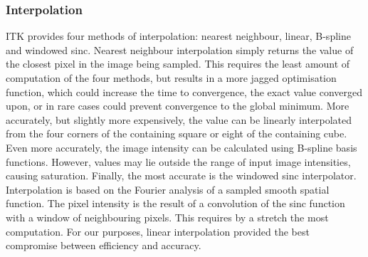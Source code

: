     \subsubsection{Interpolation} %
    \label{ssub:interpolation}
      ITK provides four methods of interpolation: nearest neighbour, linear, B-spline and windowed sinc. Nearest neighbour interpolation simply returns the value of the closest pixel in the image being sampled. This requires the least amount of computation of the four methods, but results in a more jagged optimisation function, which could increase the time to convergence, the exact value converged upon, or in rare cases could prevent convergence to the global minimum. More accurately, but slightly more expensively, the value can be linearly interpolated from the four corners of the containing square or eight of the containing cube. Even more accurately, the image intensity can be calculated using B-spline basis functions. However, values may lie outside the range of input image intensities, causing saturation. Finally, the most accurate is the windowed sinc interpolator. Interpolation is based on the Fourier analysis of a sampled smooth spatial function. The pixel intensity is the result of a convolution of the sinc function with a window of neighbouring pixels. This requires by a stretch the most computation. For our purposes, linear interpolation provided the best compromise between efficiency and accuracy.
  

